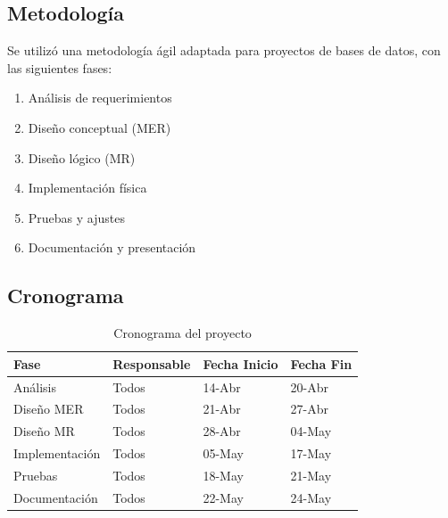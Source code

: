 \documentclass[a4paper, 12pt]{article}
\begin{document}
\subsection{Metodología}
Se utilizó una metodología ágil adaptada para proyectos de bases de datos, con las siguientes fases:
\begin{enumerate}
    \item Análisis de requerimientos
    \item Diseño conceptual (MER)
    \item Diseño lógico (MR)
    \item Implementación física
    \item Pruebas y ajustes
    \item Documentación y presentación
\end{enumerate}

\subsection{Cronograma}
\begin{table}[H]
\centering
\begin{tabular}{|l|l|l|l|}
\hline
\textbf{Fase} & \textbf{Responsable} & \textbf{Fecha Inicio} & \textbf{Fecha Fin} \\ \hline
Análisis & Todos & 14-Abr & 20-Abr \\ \hline
Diseño MER & Todos & 21-Abr & 27-Abr \\ \hline
Diseño MR & Todos & 28-Abr & 04-May \\ \hline
Implementación & Todos & 05-May & 17-May \\ \hline
Pruebas & Todos & 18-May & 21-May \\ \hline
Documentación & Todos & 22-May & 24-May \\ \hline
\end{tabular}
\caption{Cronograma del proyecto}
\end{table}
\end{document}
